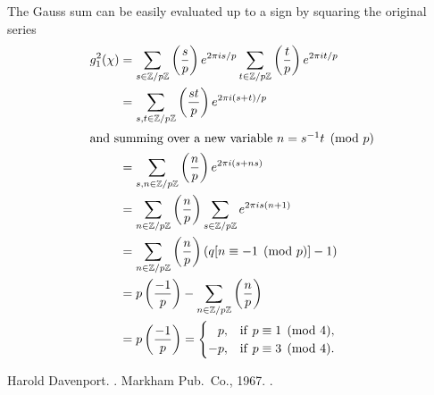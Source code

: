 \documentclass[12pt]{article}
\newcommand{\Z}{\mathbb{Z}}
\newcommand{\leg}[1]{\left(\frac{#1}{p}\right)}
\begin{document}
The Gauss sum can be easily evaluated up to a sign by squaring the original series 
\begin{align*}
g_1^2(\chi) &= \sum_{s \in \Z/p\Z} \leg{s} e^{2 \pi i s/p} \sum_{t \in \Z/p\Z} \leg{t} e^{2 \pi i t/p}\\
            &= \sum_{s,t \in \Z/p\Z} \leg{st} e^{2 \pi i(s+t)/p}\\
\intertext{and summing over a new variable $n=s^{-1} t\pmod p$}
            &= \sum_{s,n \in \Z/p\Z} \leg{n} e^{2 \pi i(s+n s)}\\
            &= \sum_{n \in \Z/p\Z} \leg{n} \sum_{s \in \Z/p\Z} e^{2 \pi i s(n+1)}\\
            &= \sum_{n \in \Z/p\Z} \leg{n} (q[n\equiv -1 \pmod p]-1)\\
            &= p\leg{-1}-\sum_{n \in \Z/p\Z} \leg{n}\\
            &= p\leg{-1}=\begin{cases}\hphantom{+{}}p,&{\rm if\ }p\equiv 1 \pmod 4 ,\\-p,&{\rm if\ }p\equiv 3 \pmod 4.\end{cases}
\end{align*}

\begin{thebibliography}{1}

Harold Davenport.
.
\newblock Markham Pub.\ Co., 1967.
\newblock {}.

\end{thebibliography}

\end{document}
